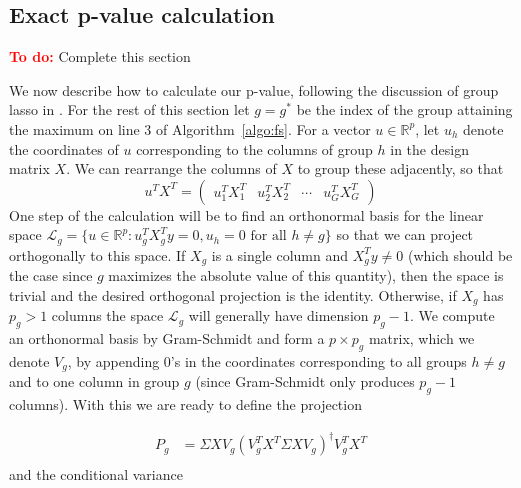 \documentclass{imsart}
\newcommand{\todo}{\textcolor{red}{\textbf{To do: }}}
\newcommand{\real}{\mathbb{R}}
\newcommand{\norm}[1]{\lVert #1 \rVert}
\newcommand{\vecsp}{\mathcal{L}}
\newcommand{\gstar}{g^*}
\begin{document}
\subsection{Exact p-value calculation}

\todo Complete this section

We now describe how to calculate our p-value, following the discussion of
group lasso in \cite{tests:adaptive}. For the rest of this section let
$g = \gstar$ be the index of
the group attaining the maximum on line 3 of Algorithm~\ref{algo:fs}.
For a vector $u \in \real^p$, let $u_h$ denote the coordinates
of $u$ corresponding to the columns of group $h$ in the design matrix $X$.
We can rearrange the columns of $X$ to group these adjacently, so that
\[
u^TX^T = \begin{pmatrix} u_1^T X_1^T & u_2^T X_2^T & \cdots & u_G^TX_G^T \end{pmatrix}
\]
One step of the calculation will be to find an orthonormal basis for the
linear space $\vecsp_g = \{ u \in \real^p : u_g^T X_g^T y = 0, u_h = 0
\text{ for all } h \neq g \}$ so that we can project orthogonally to
this space. If $X_g$ is a single column and $X_g^Ty \neq 0$ (which
should be the case since $g$ maximizes the absolute value of this
quantity), then the
space is trivial and the desired orthogonal projection is the identity.
Otherwise, if $X_g$ has $p_g > 1$ columns the space $\vecsp_g$ will
generally have dimension $p_g-1$.
We compute an orthonormal basis by Gram-Schmidt and form a
$p \times p_g$ matrix, which we denote $V_g$, by appending 0's in the
coordinates corresponding to all groups $h \neq g$ and to one column
in group $g$ (since Gram-Schmidt only produces $p_g-1$ columns).
With this we are ready to define the projection

\begin{equation}
  \begin{aligned}
    \label{eq:proj}
    P_g &= \Sigma XV_g (V_g^T X^T \Sigma X V_g)^\dagger V_g^TX^T \\
   \end{aligned}
\end{equation}
and the conditional variance
\end{document}
